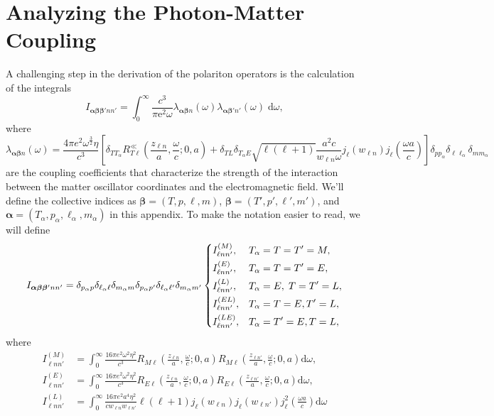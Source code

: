 
\section{Analyzing the Photon-Matter Coupling}\label{app:matterPhotonCoupling}

A challenging step in the derivation of the polariton operators is the calculation of the integrals
\begin{equation}
I_{\bm{\alpha}\bm{\beta}\bm{\beta'}nn'} = \int_0^\infty\frac{c^3}{\pi \mathrm{e}^2\omega}\lambda_{\bm{\alpha}\bm{\beta}n}(\omega)\lambda_{\bm{\alpha}\bm{\beta}'n'}(\omega)\;\mathrm{d}\omega,
\end{equation}
where
\begin{equation}
\lambda_{\bm{\alpha}\bm{\beta}n}(\omega) = \frac{4\pi e^2\omega^\frac{3}{2}\eta}{c^3}\left[\delta_{TT_\alpha}R_{T\ell}^\ll\left(\frac{z_{\ell n}}{a},\frac{\omega}{c};0,a\right) + \delta_{TL}\delta_{T_\alpha E}\sqrt{\ell(\ell+1)}\frac{a^2c}{w_{\ell n}\omega}j_\ell(w_{\ell n})j_{\ell}\left(\frac{\omega a}{c}\right)\right]\delta_{pp_\alpha}\delta_{\ell\ell_\alpha}\delta_{mm_\alpha}
\end{equation}
are the coupling coefficients that characterize the strength of the interaction between the matter oscillator coordinates and the electromagnetic field. We'll define the collective indices as $\bm{\beta} = (T,p,\ell,m)$, $\bm{\beta} = (T',p',\ell',m')$, and $\bm{\alpha} = (T_\alpha,p_\alpha,\ell_\alpha,m_\alpha)$ in this appendix. To make the notation easier to read, we will define
\begin{equation}
I_{\bm{\alpha}\bm{\beta}\bm{\beta}'nn'} = \delta_{p_\alpha p}\delta_{\ell_\alpha\ell}\delta_{m_\alpha m}\delta_{p_\alpha p'}\delta_{\ell_\alpha\ell'}\delta_{m_\alpha m'}
\begin{dcases}
I_{\ell nn'}^{(M)}, & T_\alpha = T = T' = M,\\
I_{\ell nn'}^{(E)}, & T_\alpha = T = T' = E,\\
I_{\ell nn'}^{(L)}, & T_\alpha = E,\;T = T' = L,\\
I_{\ell nn'}^{(EL)}, & T_\alpha = T = E, T' = L,\\
I_{\ell nn'}^{(LE)}, & T_\alpha = T' = E, T = L,
\end{dcases}
\end{equation}
where
\begin{equation}
\begin{split}
I_{\ell nn'}^{(M)} &= \int_0^\infty\frac{16\pi e^2\omega^2\eta^2}{c^3}R_{M\ell}\!\left(\frac{z_{\ell n}}{a},\frac{\omega}{c};0,a\right)R_{M\ell}\!\left(\frac{z_{\ell n'}}{a},\frac{\omega}{c};0,a\right)\mathrm{d}\omega,\\
I_{\ell nn'}^{(E)} &= \int_0^\infty\frac{16\pi e^2\omega^2\eta^2}{c^3}R_{E\ell}\!\left(\frac{z_{\ell n}}{a},\frac{\omega}{c};0,a\right)R_{E\ell}\!\left(\frac{z_{\ell n'}}{a},\frac{\omega}{c};0,a\right)\mathrm{d}\omega,\\
I_{\ell nn'}^{(L)} &= \int_0^\infty\frac{16\pi e^2a^4\eta^2}{c w_{\ell n}w_{\ell n'}}\ell(\ell + 1)j_\ell(w_{\ell n})j_\ell(w_{\ell n'})j_\ell^2\!\left(\frac{\omega a}{c}\right)\mathrm{d}\omega
\end{split}
\end{equation}

